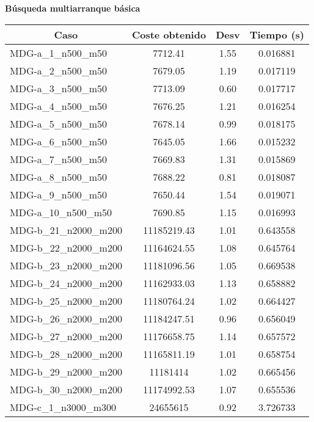 \documentclass[11pt,a4paper]{article}
\begin{document}
\newpage
\textbf{Búsqueda multiarranque básica}
\begin{table}[H]
	\begin{center}
		\begin{tabular}{|l|c|c|c|} 
			\hline
			\multicolumn{1}{|c|}{\textbf{Caso}} & \textbf{Coste obtenido} & \textbf{Desv} & \textbf{Tiempo (s)} \\ \hline
					MDG-a\_1\_n500\_m50 & 7712.41 & 1.55 & 0.016881 \\ \hline
					MDG-a\_2\_n500\_m50 & 7679.05 & 1.19 & 0.017119 \\ \hline
					MDG-a\_3\_n500\_m50 & 7713.09 & 0.60 & 0.017717 \\ \hline
					MDG-a\_4\_n500\_m50 & 7676.25 & 1.21 & 0.016254 \\ \hline
					MDG-a\_5\_n500\_m50 & 7678.14 & 0.99 & 0.018175 \\ \hline
					MDG-a\_6\_n500\_m50 & 7645.05 & 1.66 & 0.015232 \\ \hline
					MDG-a\_7\_n500\_m50 & 7669.83 & 1.31 & 0.015869 \\ \hline
					MDG-a\_8\_n500\_m50 & 7688.22 & 0.81 & 0.018087 \\ \hline
					MDG-a\_9\_n500\_m50 & 7650.44 & 1.54 & 0.019071 \\ \hline
					MDG-a\_10\_n500\_m50 & 7690.85 & 1.15 & 0.016993 \\ \hline
					MDG-b\_21\_n2000\_m200 & 11185219.43 & 1.01 & 0.643558 \\ \hline
					MDG-b\_22\_n2000\_m200 & 11164624.55 & 1.08 & 0.645764 \\ \hline
					MDG-b\_23\_n2000\_m200 & 11181096.56 & 1.05 & 0.669538 \\ \hline
					MDG-b\_24\_n2000\_m200 & 11162933.03 & 1.13 & 0.658882 \\ \hline
					MDG-b\_25\_n2000\_m200 & 11180764.24 & 1.02 & 0.664427 \\ \hline
					MDG-b\_26\_n2000\_m200 & 11184247.51 & 0.96 & 0.656049 \\ \hline
					MDG-b\_27\_n2000\_m200 & 11176658.75 & 1.14 & 0.657572 \\ \hline
					MDG-b\_28\_n2000\_m200 & 11165811.19 & 1.01 & 0.658754 \\ \hline
					MDG-b\_29\_n2000\_m200 & 11181414 & 1.02 & 0.665456 \\ \hline
					MDG-b\_30\_n2000\_m200 & 11174992.53 & 1.07 & 0.655536 \\ \hline
					MDG-c\_1\_n3000\_m300 & 24655615 & 0.92 & 3.726733 \\ \hline

\end{tabular}
\end{center}
\end{table}
\end{document}
